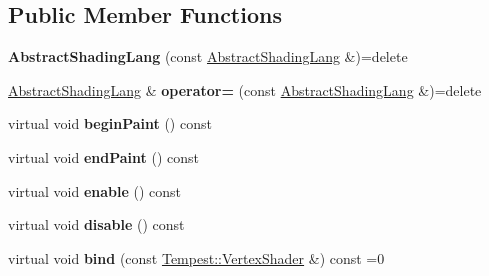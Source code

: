 \subsection*{Public Member Functions}
\begin{DoxyCompactItemize}
\item 
\hypertarget{class_tempest_1_1_abstract_shading_lang_a9eff85626d4959dcd3f4d7aeae26afb9}{{\bfseries Abstract\+Shading\+Lang} (const \hyperlink{class_tempest_1_1_abstract_shading_lang}{Abstract\+Shading\+Lang} \&)=delete}\label{class_tempest_1_1_abstract_shading_lang_a9eff85626d4959dcd3f4d7aeae26afb9}

\item 
\hypertarget{class_tempest_1_1_abstract_shading_lang_a2b34979e7d5e71ecb62f794c24193250}{\hyperlink{class_tempest_1_1_abstract_shading_lang}{Abstract\+Shading\+Lang} \& {\bfseries operator=} (const \hyperlink{class_tempest_1_1_abstract_shading_lang}{Abstract\+Shading\+Lang} \&)=delete}\label{class_tempest_1_1_abstract_shading_lang_a2b34979e7d5e71ecb62f794c24193250}

\item 
\hypertarget{class_tempest_1_1_abstract_shading_lang_ae99c7ea6c48f482580a4c03c0b2f6003}{virtual void {\bfseries begin\+Paint} () const }\label{class_tempest_1_1_abstract_shading_lang_ae99c7ea6c48f482580a4c03c0b2f6003}

\item 
\hypertarget{class_tempest_1_1_abstract_shading_lang_a378c2e82c7e2a6b50fee2c2becb3b7e7}{virtual void {\bfseries end\+Paint} () const }\label{class_tempest_1_1_abstract_shading_lang_a378c2e82c7e2a6b50fee2c2becb3b7e7}

\item 
\hypertarget{class_tempest_1_1_abstract_shading_lang_a6441662806c2437e55687252daec74e0}{virtual void {\bfseries enable} () const }\label{class_tempest_1_1_abstract_shading_lang_a6441662806c2437e55687252daec74e0}

\item 
\hypertarget{class_tempest_1_1_abstract_shading_lang_a8fd78424270fa6f9ed5829db477666fd}{virtual void {\bfseries disable} () const }\label{class_tempest_1_1_abstract_shading_lang_a8fd78424270fa6f9ed5829db477666fd}

\item 
\hypertarget{class_tempest_1_1_abstract_shading_lang_a858e44675836052523af3a988b52ddc2}{virtual void {\bfseries bind} (const \hyperlink{class_tempest_1_1_vertex_shader}{Tempest\+::\+Vertex\+Shader} \&) const =0}\label{class_tempest_1_1_abstract_shading_lang_a858e44675836052523af3a988b52ddc2}


\end{DoxyCompactItemize}
